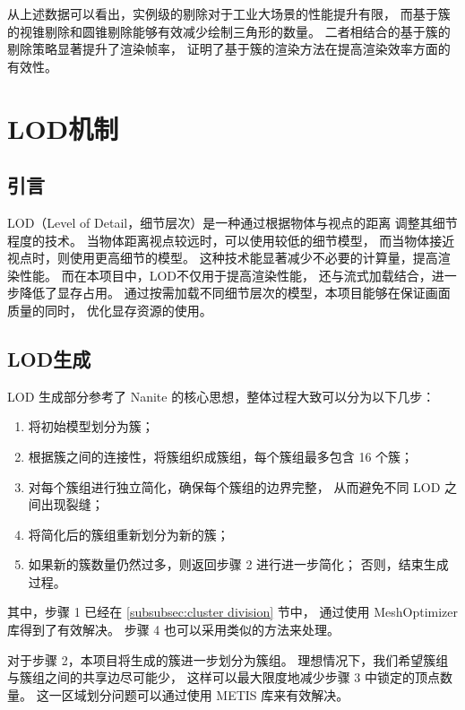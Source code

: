 从上述数据可以看出，实例级的剔除对于工业大场景的性能提升有限，
而基于簇的视锥剔除和圆锥剔除能够有效减少绘制三角形的数量。
二者相结合的基于簇的剔除策略显著提升了渲染帧率，
证明了基于簇的渲染方法在提高渲染效率方面的有效性。

\section{LOD机制}

\subsection{引言}

LOD（Level of Detail，细节层次）是一种通过根据物体与视点的距离
调整其细节程度的技术。
当物体距离视点较远时，可以使用较低的细节模型，
而当物体接近视点时，则使用更高细节的模型。
这种技术能显著减少不必要的计算量，提高渲染性能。
而在本项目中，LOD不仅用于提高渲染性能，
还与流式加载结合，进一步降低了显存占用。
通过按需加载不同细节层次的模型，本项目能够在保证画面质量的同时，
优化显存资源的使用。

\subsection{LOD生成} \label{subsec:LOD generation}

LOD 生成部分参考了 Nanite 的核心思想，整体过程大致可以分为以下几步：

\newcommand{\stepref}[1]{\textbf{Step~\ref{#1}}}

\begin{enumerate}
    \item 将初始模型划分为簇；
    \item 根据簇之间的连接性，将簇组织成簇组，每个簇组最多包含 16 个簇；
    \item 对每个簇组进行独立简化，确保每个簇组的边界完整，
    从而避免不同 LOD 之间出现裂缝；
    \item 将简化后的簇组重新划分为新的簇；
    \item 如果新的簇数量仍然过多，则返回步骤 2 进行进一步简化；
    否则，结束生成过程。
\end{enumerate}

其中，步骤 1 已经在 \ref{subsubsec:cluster division} 节中，
通过使用 MeshOptimizer 库得到了有效解决。
步骤 4 也可以采用类似的方法来处理。

对于步骤 2，本项目将生成的簇进一步划分为簇组。
理想情况下，我们希望簇组与簇组之间的共享边尽可能少，
这样可以最大限度地减少步骤 3 中锁定的顶点数量。
这一区域划分问题可以通过使用 METIS 库来有效解决。

